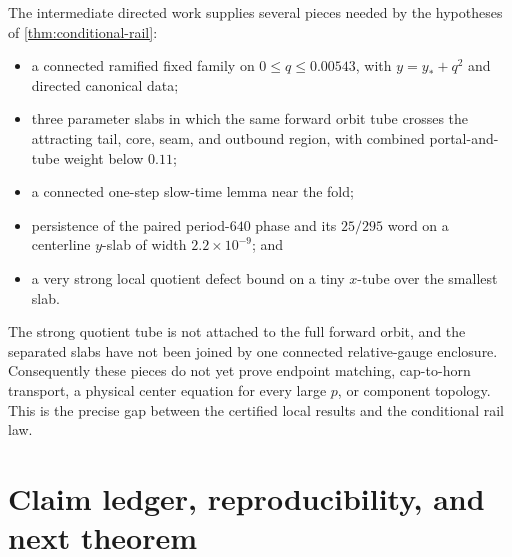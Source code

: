 \documentclass[11pt]{article}
\theoremstyle{definition}
\theoremstyle{remark}
\begin{document}
The intermediate directed work supplies several pieces needed by the hypotheses of \cref{thm:conditional-rail}:
\begin{itemize}[leftmargin=1.5em]
  \item a connected ramified fixed family on $0\le q\le0.00543$, with $y=y_*+q^2$ and directed canonical data;
  \item three parameter slabs in which the same forward orbit tube crosses the attracting tail, core, seam, and outbound region, with combined portal-and-tube weight below $0.11$;
  \item a connected one-step slow-time lemma near the fold;
  \item persistence of the paired period-$640$ phase and its $25/295$ word on a centerline $y$-slab of width $2.2\times10^{-9}$; and
  \item a very strong local quotient defect bound on a tiny $x$-tube over the smallest slab.
\end{itemize}

The strong quotient tube is not attached to the full forward orbit, and the separated slabs have not been joined by one connected relative-gauge enclosure.  Consequently these pieces do not yet prove endpoint matching, cap-to-horn transport, a physical center equation for every large $p$, or component topology.  This is the precise gap between the certified local results and the conditional rail law.

\section{Claim ledger, reproducibility, and next theorem}
\end{document}
